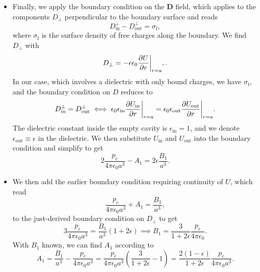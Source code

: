 \documentclass[11pt, a4paper]{article}
\renewcommand{\vec}[1]{\bm{#1}} %
\newcommand{\D}{\vec{D}}  %
\newcommand{\e}{\epsilon}
\newcommand{\ee}{\epsilon_{0}}  %
\begin{document}
\begin{itemize}
	\item Finally, we apply the boundary condition on the $ \D $ field, which applies to the components $ D_{\perp} $ perpendicular to the boundary surface and reads
	\begin{equation*}
		D_{\text{in}}^{\perp} - D_{\text{out}}^{\perp} = \sigma_{\text{f}},
	\end{equation*}
	where $ \sigma_{\text{f}} $ is the surface density of free charges along the boundary. We find $ D_{\perp} $ with
	\begin{equation*}
		D_{\perp} = - \e \ee \pdv{U}{r}\bigg |_{r=a},.
	\end{equation*}
	In our case, which involves a dielectric with only bound charges, we have $ \sigma_{\text{f}} $, and the boundary condition on $ D $ reduces to
	\begin{equation*}
		D_{\text{in}}^{\perp} = D_{\text{out}}^{\perp} \iff \ee \e_{\text{in}} \pdv{U_{\text{in}}}{r}\bigg |_{r=a} = \ee \e_{\text{out}} \pdv{U_{\text{out}}}{r}\bigg |_{r=a}.
	\end{equation*}
	The dielectric constant inside the empty cavity is $ \e_{\text{in}} = 1 $, and we denote $ \e_{\text{out}} \equiv \e $ in the dielectric. We then substitute $ U_{\text{in}} $ and $ U_{\text{out}} $ into the boundary condition and simplify to get
	\begin{equation*}
		2 \frac{p_{e}}{4\pi \ee a^{3}} - A_{1} = 2 \e \frac{B_{1}}{a^{3}}.
	\end{equation*}
	
	\item We then add the earlier boundary condition requiring continuity of $ U $, which read
	\begin{equation*}
		\frac{p_{e}}{4\pi \ee a^{3}} + A_{1} = \frac{B_{1}}{a^{3}},
	\end{equation*}
	to the just-derived boundary condition on $ D_{\perp} $ to get
	\begin{equation*}
		3 \frac{p_{e}}{4 \pi \ee a^{3}} = \frac{B_{1}}{a^{3}}(1 + 2 \e) \implies B_{1} = \frac{3}{1 + 2\e} \frac{p_{e}}{4\pi \ee}.
	\end{equation*}
	With $ B_{1} $ known, we can find $ A_{1} $ according to
	\begin{equation*}
		A_{1} = \frac{B_{1}}{a^{3}} - \frac{p_{e}}{4\pi \ee a^{3}} = \frac{p_{e}}{4\pi \ee a^{3}}\left(\frac{3}{1 + 2\e} - 1\right) = \frac{2(1 - \e)}{1 + 2\e} \frac{p_{e}}{4 \pi \ee a^{3}}.
	\end{equation*}
	

\end{itemize}
\end{document}
